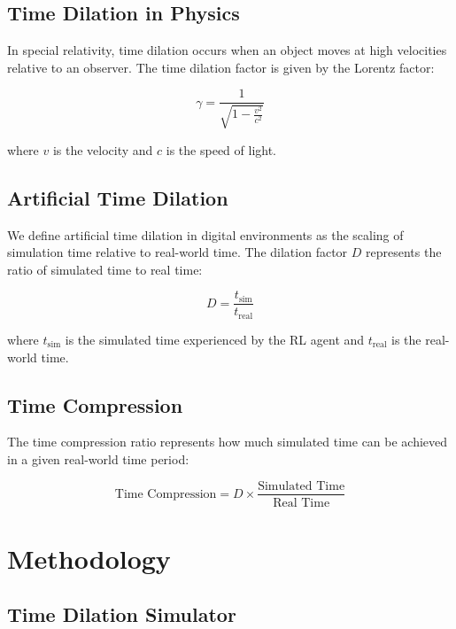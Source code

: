 \documentclass[11pt,twocolumn]{article}
\newcommand{\dilationfactor}{D}
\newcommand{\realtime}{t_{\text{real}}}
\newcommand{\simtime}{t_{\text{sim}}}
\newcommand{\lorentzfactor}{\gamma}
\begin{document}
\subsection{Time Dilation in Physics}

In special relativity, time dilation occurs when an object moves at high velocities relative to an observer. The time dilation factor is given by the Lorentz factor:

\begin{equation}
\lorentzfactor = \frac{1}{\sqrt{1 - \frac{v^2}{c^2}}}
\end{equation}

where $v$ is the velocity and $c$ is the speed of light.

\subsection{Artificial Time Dilation}

We define artificial time dilation in digital environments as the scaling of simulation time relative to real-world time. The dilation factor $\dilationfactor$ represents the ratio of simulated time to real time:

\begin{equation}
\dilationfactor = \frac{\simtime}{\realtime}
\end{equation}

where $\simtime$ is the simulated time experienced by the RL agent and $\realtime$ is the real-world time.

\subsection{Time Compression}

The time compression ratio represents how much simulated time can be achieved in a given real-world time period:

\begin{equation}
\text{Time Compression} = \dilationfactor \times \frac{\text{Simulated Time}}{\text{Real Time}}
\end{equation}

\section{Methodology}

\subsection{Time Dilation Simulator}
\end{document}
